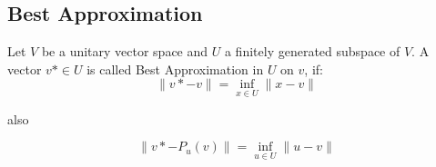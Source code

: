 \subsection{Best Approximation}

Let \(V\) be a unitary vector space and \(U\) a finitely generated subspace of \(V\).
A vector \(v* \in U\) is called Best Approximation in \(U\) on \(v\), if:
\[
\|v* - v\| = \inf_{x \in U}\|x - v\|
\]

 also

\[
\|v* - P_u(v)\| = \inf_{u \in U}\|u - v\|
\]

\newpage

